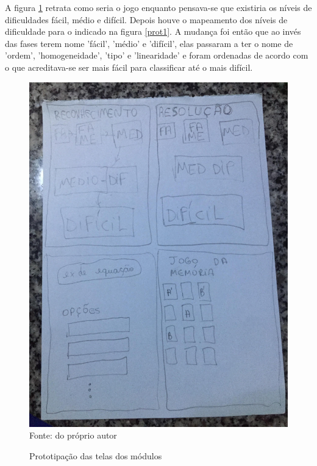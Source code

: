 A figura \ref{prot2} retrata como seria o jogo enquanto pensava-se que existiria os níveis de dificuldades fácil, médio e difícil. Depois houve o mapeamento dos níveis de dificuldade para o indicado na figura \ref{prot1}. A mudança foi então que ao invés das fases terem nome 'fácil', 'médio' e 'difícil', elas passaram a ter o nome de 'ordem', 'homogeneidade', 'tipo' e 'linearidade' e foram ordenadas de acordo com o que acreditava-se ser mais fácil para classificar até o mais difícil.


\begin{figure}[H]
\centering
\caption{Prototipação das telas dos módulos}
\includegraphics[scale=0.13]{figuras/prot2.jpg}
\label{prot2}
\\
\small{Fonte: do próprio autor}
\end{figure}

